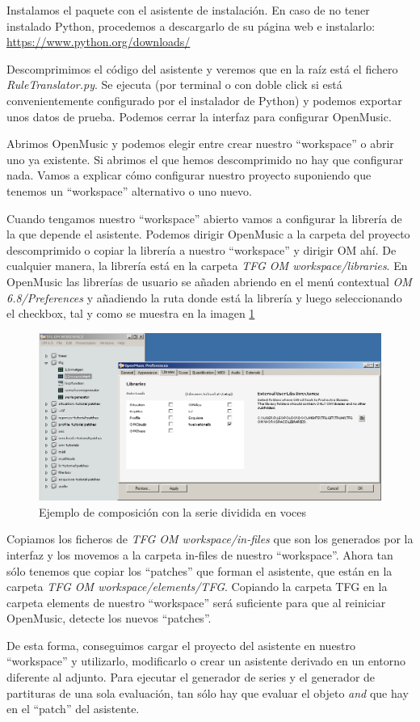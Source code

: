 \documentclass[a4paper,openany,oneside,12pt]{book}
\begin{document}
Instalamos el paquete con el asistente de instalación. En caso de no tener instalado Python, procedemos a descargarlo de su página web e instalarlo: \url{https://www.python.org/downloads/}

Descomprimimos el código del asistente y veremos que en la raíz está el fichero \emph{RuleTranslator.py}. Se ejecuta (por terminal o con doble click si está convenientemente configurado por el instalador de Python) y podemos exportar unos datos de prueba. Podemos cerrar la interfaz para configurar OpenMusic.

Abrimos OpenMusic y podemos elegir entre crear nuestro ``workspace'' o abrir uno ya existente. Si abrimos el que hemos descomprimido no hay que configurar nada. Vamos a explicar cómo configurar nuestro proyecto suponiendo que tenemos un ``workspace'' alternativo o uno nuevo.

Cuando tengamos nuestro ``workspace'' abierto vamos a configurar la librería de la que depende el asistente. Podemos dirigir OpenMusic a la carpeta del proyecto descomprimido o copiar la librería a nuestro ``workspace'' y dirigir OM ahí. De cualquier manera, la librería está en la carpeta \emph{TFG OM workspace/libraries}. En OpenMusic las librerías de usuario se añaden abriendo en el menú contextual \emph{OM 6.8/Preferences} y añadiendo la ruta donde está la librería y luego seleccionando el checkbox, tal y como se muestra en la imagen \ref{fig:configom}


\begin{figure}
\centering
\includegraphics[width=\textwidth]{img/configom.png}
\caption{Ejemplo de composición con la serie dividida en voces} \label{fig:configom}
\end{figure}

Copiamos los ficheros de \emph{TFG OM workspace/in-files} que son los generados por la interfaz y los movemos a la carpeta in-files de nuestro ``workspace''. Ahora tan sólo tenemos que copiar los ``patches'' que forman el asistente, que están en la carpeta \emph{TFG OM workspace/elements/TFG}. Copiando la carpeta TFG en la carpeta elements de nuestro ``workspace'' será suficiente para que al reiniciar OpenMusic, detecte los nuevos ``patches''.

De esta forma, conseguimos cargar el proyecto del asistente en nuestro ``workspace'' y utilizarlo, modificarlo o crear un asistente derivado en un entorno diferente al adjunto. Para ejecutar el generador de series y el generador de partituras de una sola evaluación, tan sólo hay que evaluar el objeto \emph{and} que hay en el ``patch'' del asistente.
\end{document}
